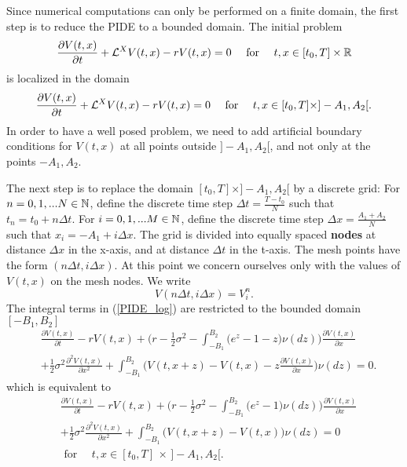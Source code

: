 Since numerical computations can only be performed on a finite domain, the first step is to reduce the PIDE to a bounded domain.
The initial problem
$$  \frac{\partial V(t,x)}{\partial t} + \mathcal{L}^{X} V(t,x) -r V(t,x) = 0  \quad \mbox{ for } \quad t,x \in [t_0,T]\times \mathbb{R} $$
is localized in the domain 
$$  \frac{\partial V(t,x)}{\partial t} + \mathcal{L}^{X} V(t,x) -r V(t,x) = 0  \quad \mbox{ for } \quad t,x \in [t_0,T]\times ]-A_1,A_2[. $$
In order to have a well posed problem, we need to add artificial boundary conditions for $V(t,x)$ at all points outside $]-A_1,A_2[$, and not only at the points $-A_1, A_2$.

The next step is to replace the domain $[t_0,T]\times ]-A_1,A_2[$ by a discrete grid:
For $n = 0,1, ... N \in \mathbb{N}$, define the discrete time step $ \Delta t = \frac{T - t_0}{N} $ such that
$t_n = t_0 + n \Delta t$. For $i = 0,1, ... M \in \mathbb{N}$, define the discrete time step $ \Delta x = \frac{A_1 + A_2}{N} $ such that
$x_i = -A_1 + i \Delta x$.
The grid is divided into equally spaced \textbf{nodes} at distance $\Delta x$ in the x-axis, and at distance $\Delta t$ in the t-axis.
The mesh points have the form $(n \Delta t, i \Delta x)$.
At this point we concern ourselves only with the values of $V(t,x)$ on the mesh nodes. We write 
$$ V(n \Delta t, i \Delta x) = V^n_i .$$
The integral terms in (\ref{PIDE_log}) are restricted to the bounded domain $[-B_1,B_2]$
\begin{align*}
&  \frac{\partial V(t,x)}{\partial t} - r V(t,x) 
          + \biggl( r -\frac{1}{2}\sigma^2 - \int_{-B_1}^{B_2} \bigl( e^z-1-z \bigr) \nu(dz) \biggr) \frac{\partial V(t,x)}{\partial x} \\ \nonumber
          &+ \frac{1}{2} \sigma^2 \frac{\partial^2 V(t,x)}{\partial x^2} 
          + \int_{-B_1}^{B_2} \bigl( V(t,x+z)- V(t,x) - z \frac{\partial V(t,x)}{\partial x} \bigr) \nu(dz)  = 0.
\end{align*}
which is equivalent to 
\begin{align}\label{restricted_domain}
&  \frac{\partial V(t,x)}{\partial t} - r V(t,x) 
          + \biggl( r -\frac{1}{2}\sigma^2 - \int_{-B_1}^{B_2} \bigl( e^z-1 \bigr) \nu(dz) \biggr) \frac{\partial V(t,x)}{\partial x} \\ \nonumber
          &+ \frac{1}{2} \sigma^2 \frac{\partial^2 V(t,x)}{\partial x^2} 
          + \int_{-B_1}^{B_2} \bigl( V(t,x+z)- V(t,x) \bigr) \nu(dz)  = 0 \\ \nonumber
          & \mbox{ for } \quad t,x \in [t_0,T]\, \times \, ]-A_1,A_2[.
\end{align}
